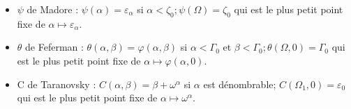 \documentclass[8pt]{article}
\begin{document}
\vspace{-0.4cm}
\smallskip
\begin{itemize}
     \setlength{\itemsep}{1pt}
     \setlength{\parskip}{0pt}
     \setlength{\parsep}{0pt}
\item \(\psi\) de Madore : \(\psi(\alpha) = \varepsilon_\alpha \) si \(\alpha < \zeta_0 ; \psi(\Omega) = \zeta_0 \) qui est le plus petit point fixe de \( \alpha \mapsto \varepsilon_\alpha \).
\vspace{-0.1cm}
\item \(\theta\) de Feferman : \(\theta(\alpha,\beta) = \varphi(\alpha,\beta) \) si \( \alpha < \Gamma_0 \) et \( \beta < \Gamma_0 ; \theta(\Omega,0) = \Gamma_0 \) qui est le plus petit point fixe de \( \alpha \mapsto \varphi(\alpha,0) \).
\vspace{-0.1cm}
\item C de Taranovsky : \( C(\alpha,\beta) = \beta+\omega^\alpha \) si \( \alpha \) est dénombrable; \( C(\Omega_1,0) = \varepsilon_0 \) qui est le plus petit point fixe de \( \alpha \mapsto \omega^\alpha \).
\end{itemize}

\vspace{0.1cm}
\end{document}
